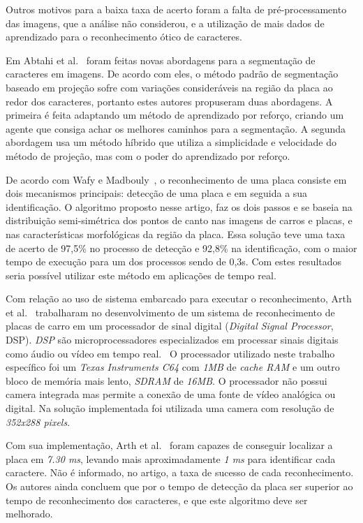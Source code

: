 Outros motivos para a baixa taxa de acerto foram a falta de pré-processamento
das imagens, que a análise não considerou, e a utilização de mais dados de
aprendizado para o reconhecimento ótico de caracteres.

Em Abtahi et al.~\cite{abtahi2015deep} foram feitas novas abordagens para a
segmentação de caracteres em imagens. De acordo com eles, o método padrão de
segmentação baseado em projeção sofre com variações consideráveis na região da
placa ao redor dos caracteres, portanto estes autores propuseram duas abordagens.
A primeira é feita adaptando um método de aprendizado por reforço, criando um agente que
consiga achar os melhores caminhos para a segmentação.  A segunda abordagem usa
um método híbrido que utiliza a simplicidade e velocidade do método de projeção,
mas com o poder do aprendizado por reforço.

De acordo com Wafy e Madbouly~\cite{wafy2016efficient}, o reconhecimento de uma
placa consiste em dois mecanismos principais: detecção de uma placa e em seguida
a sua identificação. O algoritmo proposto nesse artigo, faz os dois passos e se
baseia na distribuição semi-simétrica dos pontos de canto nas imagens de carros
e placas, e nas características morfológicas da região da placa. Essa solução
teve uma taxa de acerto de 97,5\% no processo de detecção e 92,8\% na
identificação, com o maior tempo de execução para um dos processos sendo de
0,3s. Com estes resultados seria possível utilizar este método em aplicações de
tempo real.

Com relação ao uso de sistema embarcado para executar o reconhecimento, Arth et
al.~\cite{arth2007real} trabalharam no desenvolvimento de um sistema de reconhecimento
de placas de carro em um processador de sinal digital (\emph{Digital Signal Processor}, DSP).
\emph{DSP} são microprocessadores especializados em
processar sinais digitais como áudio ou vídeo em tempo real.~\cite{yovits1993advances} O processador utilizado
neste trabalho específico foi um \emph{Texas Instruments C64} com \emph{1MB} de \emph{cache RAM} e um outro bloco
de memória mais lento, \emph{SDRAM} de \emph{16MB}. O processador não possui camera integrada mas permite a conexão de
uma fonte de vídeo analógica ou digital. Na solução implementada foi utilizada uma camera com resolução de \emph{352x288 pixels}.

Com sua implementação, Arth et al.~\cite{arth2007real} foram capazes de conseguir localizar a placa em
\emph{7.30 ms}, levando mais aproximadamente \emph{1 ms} para identificar cada caractere. Não é informado, no artigo,
a taxa de sucesso de cada reconhecimento. Os autores ainda concluem que por o tempo de detecção da placa ser superior
ao tempo de reconhecimento dos caracteres, e que este algoritmo deve ser melhorado.

